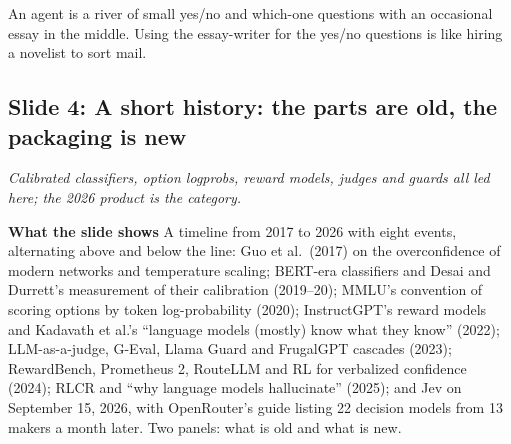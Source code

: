 \documentclass[11pt,letterpaper]{article}
\newcommand{\slide}[3]{%
  \subsection[Slide #1: #2]{Slide #1: #2}%
  {\color{muted}\itshape #3\par}\medskip}
\newcommand{\para}[1]{\medskip\noindent\textbf{#1}\quad}
\newenvironment{intuition}{\begin{tcolorbox}[intuitionbox]}{\end{tcolorbox}}
\begin{document}
\begin{intuition}
An agent is a river of small yes/no and which-one questions with an occasional essay in the middle. Using the essay-writer for the yes/no questions is like hiring a novelist to sort mail.
\end{intuition}

\slide{4}{A short history: the parts are old, the packaging is new}{Calibrated classifiers, option logprobs, reward models, judges and guards all led here; the 2026 product is the category.}

\para{What the slide shows} A timeline from 2017 to 2026 with eight events, alternating above and below the line: Guo et al.\ (2017) on the overconfidence of modern networks and temperature scaling; BERT-era classifiers and Desai and Durrett's measurement of their calibration (2019--20); MMLU's convention of scoring options by token log-probability (2020); InstructGPT's reward models and Kadavath et al.'s ``language models (mostly) know what they know'' (2022); LLM-as-a-judge, G-Eval, Llama Guard and FrugalGPT cascades (2023); RewardBench, Prometheus 2, RouteLLM and RL for verbalized confidence (2024); RLCR and ``why language models hallucinate'' (2025); and Jev on September 15, 2026, with OpenRouter's guide listing 22 decision models from 13 makers a month later. Two panels: what is old and what is new.
\end{document}
